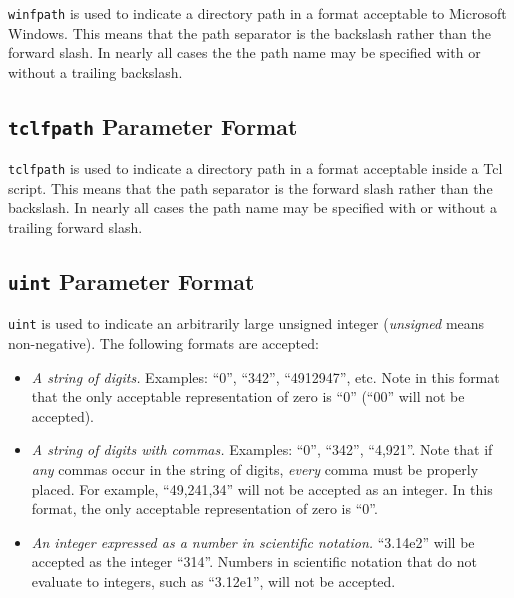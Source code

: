 \texttt{winfpath} is used to indicate a directory path in a format
acceptable to Microsoft Windows.  This means that the path 
separator is the backslash rather than the forward slash.  In nearly all
cases the the path name may be specified with or without a trailing backslash.


\subsection{\texttt{tclfpath} Parameter Format}
\label{ctin0:sccl0:stcf1}

\texttt{tclfpath} is used to indicate a directory path in a format
acceptable inside a Tcl script.  This means that the path 
separator is the forward slash rather than the backslash.
In nearly all cases the path name may be specified with or without
a trailing forward slash.


\subsection{\texttt{uint} Parameter Format}
\label{ctin0:sccl0:suin0}

\texttt{uint} is used to indicate an arbitrarily large unsigned integer 
(\emph{unsigned} means non-negative).  The following formats are accepted:

\begin{itemize}
\item \emph{A string of digits.}  Examples: ``0'', ``342'', ``4912947'', etc.
      Note in this format that the only acceptable representation of 
      zero is ``0'' (``00'' will not be accepted).
\item \emph{A string of digits with commas.}  Examples: ``0'',
      ``342'', ``4,921''.  Note that if \emph{any} commas occur
      in the string of digits, \emph{every} comma must be
      properly placed.  For example, ``49,241,34'' will not be accepted
      as an integer.  In this format, the only acceptable representation
      of zero is ``0''.
\item \emph{An integer expressed as a number in scientific notation.}
      ``3.14e2'' will be accepted as the integer ``314''.  Numbers in
      scientific notation that do not evaluate to integers, such
      as ``3.12e1'', will not be accepted.
\end{itemize}


